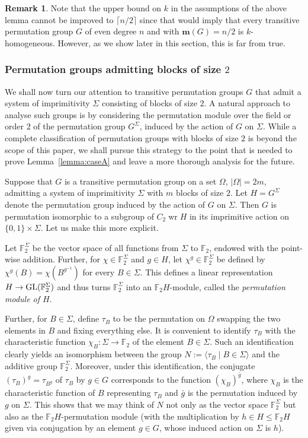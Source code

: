 \documentclass[a4paper]{amsart}
\renewcommand{\wr}{\mathop{\mathrm{wr}}}
\newcommand{\FF}{\mathbb{F}}
\newcommand{\m}{\mathbf{m}}
\theoremstyle{definition}
\newtheorem{remark}[theorem]{Remark}
\begin{document}
\begin{remark}
    Note that the upper bound on $k$ in the assumptions of the above lemma cannot be improved to
    $\lceil n/2 \rceil$
    since that would imply that
    every transitive permutation group $G$ of even degree $n$ and with $\m(G) = n/2$ is $k$-homogeneous. However, as we show later in this section, this is far from true.
\end{remark}

\subsubsection{Permutation groups admitting blocks of size $2$}
We shall now turn our attention to transitive permutation groups $G$ that admit a system of imprimitivity $\Sigma$ consisting of blocks of size $2$. A natural approach to analyse such groups is by considering the permutation module over the field or order $2$ of the permutation group $G^\Sigma$, induced by the action of $G$ on $\Sigma$. While a complete classification of permutation groups with blocks of size $2$ is beyond the scope of this paper, we shall pursue this strategy to the point that is needed to prove
Lemma~\ref{lemma:caseA} and leave a more thorough analysis for the future.

Suppose that $G$ is a transitive permutation group on a set $\Omega$, $|\Omega| =2m$, admitting a system of imprimitivity $\Sigma$ with $m$ blocks of size $2$. Let $H=G^\Sigma$ denote the permutation group induced by the action of $G$ on $\Sigma$. Then $G$ is permutation isomorphic to a subgroup of $C_2 \wr H$ in its imprimitive action on $\{0,1\} \times \Sigma$.
Let us make this more explicit. 

Let $\FF_2^\Sigma$ be the vector space of all functions from $\Sigma$ to $\FF_2$, endowed with the point-wise addition.
Further, for $\chi \in \FF_2^\Sigma$ and $g\in H$, let $\chi^g \in \FF_2^\Sigma$ be defined by $\chi^g(B) = \chi(B^{g^{-1}})$ for every $B \in \Sigma$. This defines a linear representation $H \to {\rm GL}(\FF_2^\Sigma)$ and thus
turns $\FF_2^\Sigma$ into an $\FF_2H$-module, called the {\em permutation module of $H$}.

Further, for $B\in \Sigma$, define $\tau_B$ to be the permutation on $\Omega$ swapping the two elements in  $B$ and fixing everything else. It is convenient to identify $\tau_B$ with the characteristic function $\chi_B:\Sigma \rightarrow \FF_2$ of the element $B\in \Sigma$. Such an identification clearly yields an isomorphism
between the group $N:= \langle \tau_B \mid B \in \Sigma \rangle$ and the additive group $\FF_2^\Sigma$.
Moreover, under this identification, the conjugate $(\tau_B)^g = \tau_{B^g}$ of 
$\tau_B$ by $g\in G$ corresponds to the function $(\chi_B)^{\bar{g}}$, where $\chi_B$ is the characteristic
function of $B$ representing $\tau_B$ and $\bar{g}$ is the permutation induced by $g$ on $\Sigma$.
This shows that we may think of $N$ not only as the vector space $\FF_2^\Sigma$ but also as the $\FF_2H$-permutation
module (with the multiplication by $h\in H \le \FF_2H$ given via conjugation by an element $g\in G$, whose induced action on $\Sigma$ is $h$).
\end{document}
